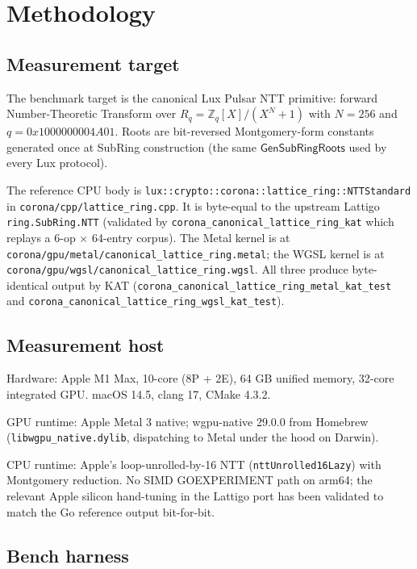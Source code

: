 \section{Methodology}
\label{sec:methodology}

\subsection{Measurement target}

The benchmark target is the canonical Lux Pulsar NTT primitive:
forward Number-Theoretic Transform over
$R_q = \mathbb{Z}_q[X]/(X^N+1)$ with $N = 256$ and
$q = 0x1000000004A01$. Roots are bit-reversed Montgomery-form
constants generated once at SubRing construction (the same
$\mathsf{GenSubRingRoots}$ used by every Lux protocol).

The reference CPU body is
\texttt{lux::crypto::corona::lattice\_ring::NTTStandard} in
\texttt{corona/cpp/lattice\_ring.cpp}. It is byte-equal to
the upstream Lattigo \texttt{ring.SubRing.NTT} (validated by
\texttt{corona\_canonical\_lattice\_ring\_kat} which replays a
6-op $\times$ 64-entry corpus). The Metal kernel is at
\texttt{corona/gpu/metal/canonical\_lattice\_ring.metal}; the
WGSL kernel is at \texttt{corona/gpu/wgsl/canonical\_lattice\_ring.wgsl}.
All three produce byte-identical output by KAT
(\texttt{corona\_canonical\_lattice\_ring\_metal\_kat\_test} and
\texttt{corona\_canonical\_lattice\_ring\_wgsl\_kat\_test}).

\subsection{Measurement host}

Hardware: Apple M1 Max, 10-core (8P + 2E), 64 GB unified memory,
32-core integrated GPU. macOS 14.5, clang 17, CMake 4.3.2.

GPU runtime: Apple Metal 3 native; wgpu-native 29.0.0 from Homebrew
(\texttt{libwgpu\_native.dylib}, dispatching to Metal under the hood
on Darwin).

CPU runtime: Apple's loop-unrolled-by-16 NTT
(\texttt{nttUnrolled16Lazy}) with Montgomery reduction. No SIMD
GOEXPERIMENT path on arm64; the relevant Apple silicon hand-tuning
in the Lattigo port has been validated to match the Go reference
output bit-for-bit.

\subsection{Bench harness}

